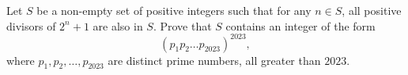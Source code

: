 Let $S$ be a non-empty set of positive integers such that for any $n\in S$,
all positive divisors of $2^n+1$ are also in $S$. Prove that $S$ contains an integer of the form
$$(p_1 p_2 \dots p_{2023})^{2023},$$
where $p_1,p_2, \ldots, p_{2023}$ are distinct prime numbers, all greater than $2023$.
